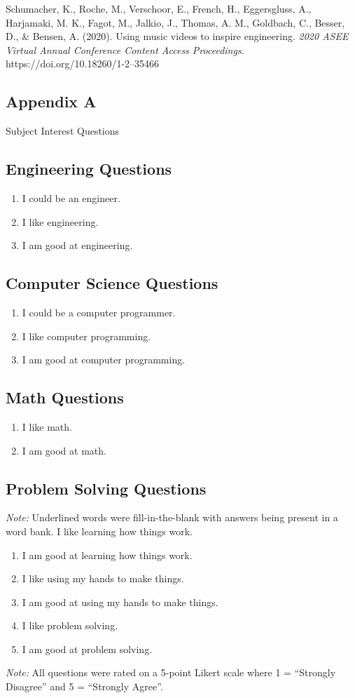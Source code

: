 \documentclass[11.5pt]{sig-alternate}
\begin{document}
Schumacher, K., Roche, M., Verschoor, E., French, H., Eggersgluss, A., Harjamaki, M. K., Fagot, M., Jalkio, J., Thomas, A. M., Goldbach, C., Besser, D., \& Bensen, A. (2020). Using music videos to inspire engineering.\textit{ 2020 ASEE Virtual Annual Conference Content Access Proceedings}. https://doi.org/10.18260/1-2--35466

 
\begin{large}
\twocolumn
\section*{ Appendix A}
Subject Interest Questions

\subsection*{Engineering Questions}
\begin{enumerate}
  \item I could be an engineer.
  \item I like engineering.
  \item I am good at engineering.
\end{enumerate}

\subsection*{Computer Science Questions}
\begin{enumerate}
  \item I could be a computer programmer.
  \item I like computer programming.
  \item I am good at computer programming.
\end{enumerate}

\subsection*{Math Questions}
\begin{enumerate}
  \item I like math.
  \item I am good at math.
\end{enumerate}

\subsection*{Problem Solving  Questions} 
\textit{Note:} Underlined words were fill-in-the-blank with answers being present in a word bank. I like learning how things work.
\begin{enumerate}
    \item I am good at learning how things work.
    \item I like using my hands to make things.
    \item I am good at using my hands to make things.
    \item I like problem solving.
    \item I am good at problem solving.
\end{enumerate}
\textit{Note:} All questions were rated on a 5-point Likert scale where 1 = “Strongly Disagree” and 5 = “Strongly Agree”.

\end{large}
\end{document}
